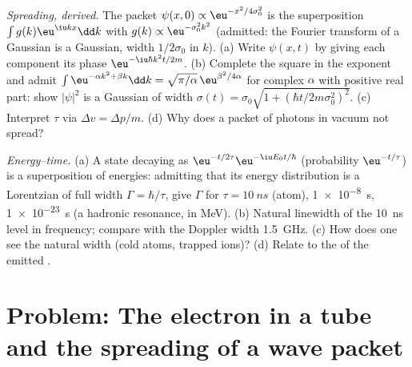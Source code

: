 \begin{exercise}[$\star\star\star$]\label{exo:b2:schrodinger-wave-functions:11}
\emph{Spreading, derived.} The packet $\psi(x,0) \propto \eu^{-x^2/4\sigma_0^2}$
is the superposition $\int g(k)\eu^{\iu kx}\dd k$ with $g(k) \propto
\eu^{-\sigma_0^2k^2}$ (admitted: the Fourier transform of a Gaussian is a
Gaussian, width $1/2\sigma_0$ in $k$). (a) Write $\psi(x,t)$ by giving each
component its phase $\eu^{-\iu\hbar k^2t/2m}$. (b) Complete the square in
the exponent and admit $\int\eu^{-\alpha k^2 + \beta k}\dd k = \sqrt{\pi/\alpha}\,
\eu^{\beta^2/4\alpha}$ for complex $\alpha$ with positive real part: show
$|\psi|^2$ is a Gaussian of width $\sigma(t) = \sigma_0\sqrt{1 + (\hbar t/2m
\sigma_0^2)^2}$. (c) Interpret $\tau$ via $\Delta v = \Delta p/m$. (d) Why does
a packet of photons in vacuum not spread?
\end{exercise}

\begin{exercise}[$\star\star\star$]\label{exo:b2:schrodinger-wave-functions:12}
\emph{Energy--time.} (a) A state decaying as $\eu^{-t/2\tau}\eu^{-\iu E_0t/\hbar}$
(probability $\eu^{-t/\tau}$) is a superposition of energies: admitting
that its energy distribution is a Lorentzian of full width $\Gamma =
\hbar/\tau$, give $\Gamma$ for $\tau = \qty{10}{ns}$ (atom), \qty{1e-8}{s},
\qty{1e-23}{s} (a hadronic resonance, in MeV). (b) Natural linewidth of
the \qty{10}{ns} level in frequency; compare with the Doppler width
\qty{1.5}{GHz}. (c) How does one see the natural width (cold atoms,
trapped ions)? (d) Relate to the  of the emitted .
\end{exercise}

\section{Problem: The electron in a tube and the spreading of a wave packet}

